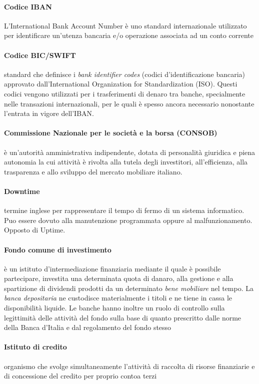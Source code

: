 \paragraph{Codice IBAN}
	L'International Bank Account Number è uno standard internazionale utilizzato per identificare un'utenza bancaria e/o operazione associata ad un conto corrente 
\paragraph{Codice BIC/SWIFT}
	standard che definisce i \emph{bank identifier codes} (codici d'identificazione bancaria) approvato dall'International Organization for Standardization (ISO). Questi codici vengono utilizzati per i trasferimenti di denaro tra banche, specialmente nelle transazioni internazionali, per le quali è spesso ancora necessario nonostante l'entrata in vigore dell'IBAN. \cite{bic_wiki}
\paragraph{Commissione Nazionale per le societ\`a e la borsa (CONSOB)}
	è un'autorità amministrativa indipendente, dotata di personalità giuridica e piena autonomia la cui attività è rivolta alla tutela degli investitori, all'efficienza, alla trasparenza e allo sviluppo del mercato mobiliare italiano. \cite{consob_wiki}
\paragraph{Downtime}
termine inglese per rappresentare il tempo di fermo di un sistema informatico.
Puo essere dovuto alla manutenzione programmata oppure al malfunzionamento.
Opposto di Uptime.
\paragraph{Fondo comune di investimento}
	è un istituto d'intermediazione finanziaria mediante il quale è possibile partecipare, investita una determinata quota di danaro, alla gestione e alla spartizione di dividendi prodotti da un determinato \emph{bene mobiliare} nel tempo. La \emph{banca depositaria} ne custodisce materialmente i titoli e ne tiene in cassa le disponibilità liquide. Le banche hanno inoltre un ruolo di controllo sulla legittimità delle attività del fondo sulla base di quanto prescritto dalle norme della Banca d'Italia e dal regolamento del fondo stesso
\paragraph{Istituto di credito}
	organismo che svolge simultaneamente l’attività di raccolta di risorse finanziarie e di concessione del credito per proprio contoa terzi 
